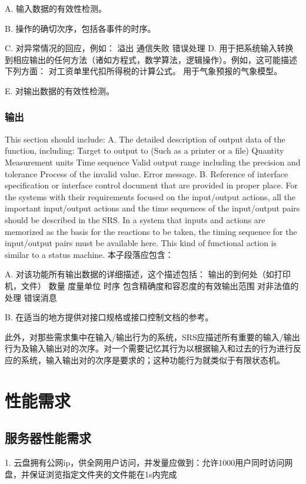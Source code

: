 A. 输入数据的有效性检测。

B. 操作的确切次序，包括各事件的时序。

C. 对异常情况的回应，例如：
		溢出
		通信失败
		错误处理
D. 用于把系统输入转换到相应输出的任何方法（诸如方程式，数学算法，逻辑操作）。例如，这可能描述下列方面：
		对工资单里代扣所得税的计算公式。
		用于气象预报的气象模型。
		
E.	对输出数据的有效性检测。
\subsubsection{输出}
This section should include:
A. The detailed description of output data of the function, including:
		Target to output to (Such as a printer or a file)
		Quantity
		Measurement units
		Time sequence
		Valid output range including the precision and tolerance
		Process of the invalid value.
		Error message.
B. Reference of interface specification or interface control document that are provided in proper place.
For the systems with their requirements focused on the input/output actions, all the important input/output actions and the time sequences of the input/output pairs should be described in the SRS. In a system that inputs and actions are memorized as the basis for the reactions to be taken, the timing sequence for the input/output pairs must be available here. This kind of functional action is similar to a status machine.  
本子段落应包含：

A. 对该功能所有输出数据的详细描述，这个描述包括：
		输出的到何处（如打印机，文件）
		数量
		度量单位
		时序
		包含精确度和容忍度的有效输出范围
		对非法值的处理
		错误消息
		
B. 在适当的地方提供对接口规格或接口控制文档的参考。

此外，对那些需求集中在输入/输出行为的系统，SRS应描述所有重要的输入/输出行为及输入输出对的次序。对一个需要记忆其行为以根据输入和过去的行为进行反应的系统，输入输出对的次序是要求的；这种功能行为就类似于有限状态机。

\section{性能需求}

\subsection{服务器性能需求}
 
1. 云盘拥有公网ip，供全网用户访问，并发量应做到：允许1000用户同时访问网盘，并保证浏览指定文件夹的文件能在1s内完成

